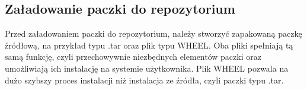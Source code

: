 \quad 


\subsection{Załadowanie paczki do repozytorium}

\quad Przed załadowaniem paczki do repozytorium, należy stworzyć zapakowaną paczkę źródłową, na przykład typu .tar oraz plik typu WHEEL. Oba pliki spełniają tą samą funkcję, czyli przechowywnie niezbędnych elementów paczki oraz umożliwiają ich instalację na systemie użytkownika. Plik WHEEL pozwala na dużo szybszy proces instalacji niż instalacja ze źródła, czyli paczki typu .tar. 
